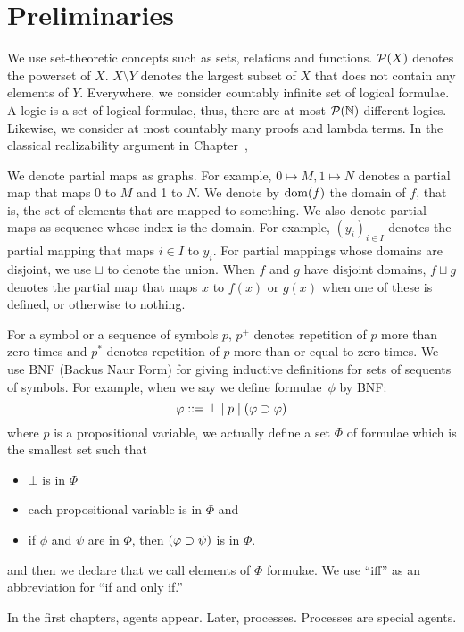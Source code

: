  \section{Preliminaries}

 We use set-theoretic concepts such as sets, relations and functions.
 ${\mathcal P({X})}$ denotes the powerset of $X$.
   $X\setminus Y$ denotes the largest subset of $X$ that does not contain
   any elements of $Y$.
   Everywhere, we consider countably infinite set of logical formulae.
   A logic is a set of logical formulae, thus, there are at most
   ${\mathcal P({\mathbb N})}$ different logics.
   Likewise, we consider at most countably many proofs and lambda terms.
   In the classical realizability argument in Chapter~\fix{},

   We denote partial maps as graphs.
   For example, ${0\mapsto M, 1\mapsto N}$ denotes a partial map that
   maps 0 to $M$ and 1 to $N$.
   We denote by $\mathop{\mathrm{dom}}(f)$ the domain of $f$, that is,
   the set of elements that are mapped to something.
   We also denote partial maps as sequence whose index is the domain.
   For example, $(y_i)_{i\in I}$ denotes the partial mapping that maps
   $i\in I$ to $y_i$.
   For partial mappings whose domains are disjoint, we use $\sqcup$ to
   denote the union.
   When $f$ and $g$ have disjoint domains, $f\sqcup g$ denotes the
   partial map that maps $x$ to $f(x)$ or $g(x)$ when one of these is
   defined, or otherwise to nothing.

  For a symbol or a sequence of symbols $p$,
  $p^+$ denotes repetition of $p$ more than zero times and
  $p^*$ denotes repetition of $p$ more than or equal to zero times.
  We use BNF (Backus Naur Form) for giving inductive definitions for sets
  of sequents of symbols.
  For example, when we say we define formulae~$\phi$ by BNF:
  \[
   \varphi::= \bot \mid p\mid (\varphi\supset\varphi)
  \]
  where $p$ is a propositional variable, we actually define a set $\Phi$
  of formulae which is the smallest set such that
  \begin{itemize}
   \item $\bot$ is in $\Phi$
   \item each propositional variable is in $\Phi$ and
   \item if $\phi$ and $\psi$ are in $\Phi$, then $(\varphi\supset\psi)$ is in $\Phi$.
  \end{itemize}
  and then we declare that we call elements of $\Phi$ formulae.
  We use ``iff'' as an abbreviation for ``if and only if.''

  In the first chapters, agents appear.  Later, processes.  Processes
  are special agents.


